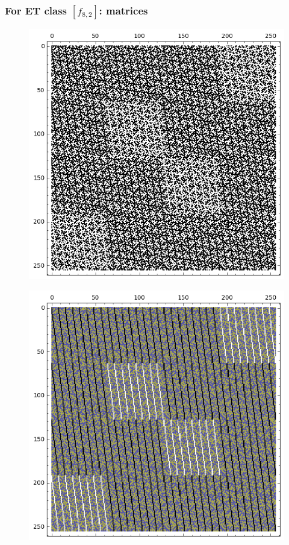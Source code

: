 \documentclass[pdf,sprung,slideColor,nocolorBG]{beamer}
\begin{document}
\begin{frame}
\frametitle{For ET class $[f_{8,2}]$: matrices}
\begin{figure}
\centering
\begin{minipage}{.48\textwidth}
  \centering
  \includegraphics[width=.9\linewidth]{../matrix_plot/c8_2_weight_class_matrix.png}
  \label{fig:8_2_weight_class_matrix}
\end{minipage}%
\begin{minipage}{.48\textwidth}
  \centering
  \includegraphics[width=.9\linewidth]{../matrix_plot/c8_2_bent_cayley_graph_index_matrix.png}
  \label{fig:8_2_bent_cayley_graph_index_matrix}
\end{minipage}
\end{figure}
\end{frame}
\end{document}
